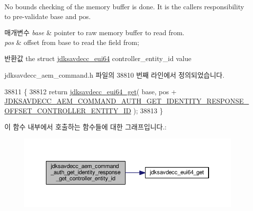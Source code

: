 No bounds checking of the memory buffer is done. It is the caller\textquotesingle{}s responsibility to pre-\/validate base and pos.


\begin{DoxyParams}{매개변수}
{\em base} & pointer to raw memory buffer to read from. \\
\hline
{\em pos} & offset from base to read the field from; \\
\hline
\end{DoxyParams}
\begin{DoxyReturn}{반환값}
the struct \hyperlink{structjdksavdecc__eui64}{jdksavdecc\+\_\+eui64} controller\+\_\+entity\+\_\+id value 
\end{DoxyReturn}


jdksavdecc\+\_\+aem\+\_\+command.\+h 파일의 38810 번째 라인에서 정의되었습니다.


\begin{DoxyCode}
38811 \{
38812     \textcolor{keywordflow}{return} \hyperlink{group__eui64_ga2652311a25a6b91cddbed75c108c7031}{jdksavdecc\_eui64\_get}( base, pos + 
      \hyperlink{group__command__auth__get__identity__response_ga7b6e0ad16afd0f467bd713fe371b5f95}{JDKSAVDECC\_AEM\_COMMAND\_AUTH\_GET\_IDENTITY\_RESPONSE\_OFFSET\_CONTROLLER\_ENTITY\_ID}
       );
38813 \}
\end{DoxyCode}


이 함수 내부에서 호출하는 함수들에 대한 그래프입니다.\+:
\nopagebreak
\begin{figure}[H]
\begin{center}
\leavevmode
\includegraphics[width=350pt]{group__command__auth__get__identity__response_ga5471fa39d3656bdb470bb79efe337813_cgraph}
\end{center}
\end{figure}


